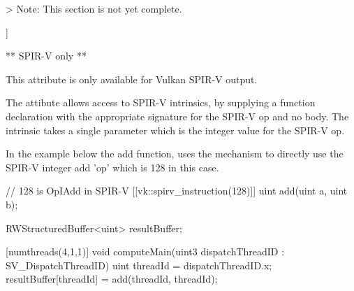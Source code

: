 
> Note: This section is not yet complete.


\begin{codeblock}
[[vk::spirv_instruction]]
\end{codeblock}

** SPIR-V only **

This attribute is only available for Vulkan SPIR-V output.

The attibute allows access to SPIR-V intrinsics, by supplying a function declaration with the appropriate signature for the SPIR-V op and no body. The intrinsic takes a single parameter which is the integer value for the SPIR-V op. 

In the example below the add function, uses the mechanism to directly use the SPIR-V integer add 'op' which is 128 in this case.

\begin{codeblock}
// 128 is OpIAdd in SPIR-V
[[vk::spirv_instruction(128)]]
uint add(uint a, uint b);

RWStructuredBuffer<uint> resultBuffer;

[numthreads(4,1,1)]
void computeMain(uint3 dispatchThreadID : SV_DispatchThreadID)
{
    uint threadId = dispatchThreadID.x;
    resultBuffer[threadId] = add(threadId, threadId);
}
\end{codeblock}

